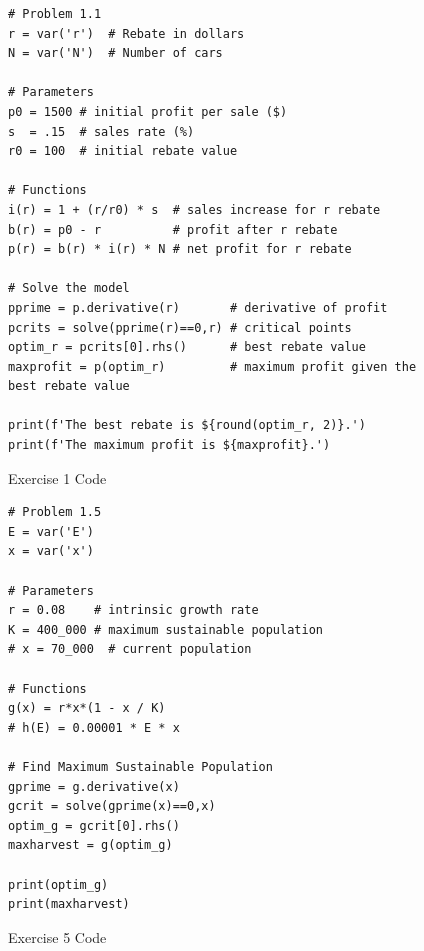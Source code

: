 \documentclass[12pt, oneside]{book}
\begin{document}
\begin{figure}
    \label{ex:1}
    \begin{verbatim}
# Problem 1.1
r = var('r')  # Rebate in dollars
N = var('N')  # Number of cars 

# Parameters
p0 = 1500 # initial profit per sale ($)
s  = .15  # sales rate (%)
r0 = 100  # initial rebate value

# Functions
i(r) = 1 + (r/r0) * s  # sales increase for r rebate
b(r) = p0 - r          # profit after r rebate
p(r) = b(r) * i(r) * N # net profit for r rebate

# Solve the model
pprime = p.derivative(r)       # derivative of profit
pcrits = solve(pprime(r)==0,r) # critical points 
optim_r = pcrits[0].rhs()      # best rebate value
maxprofit = p(optim_r)         # maximum profit given the best rebate value

print(f'The best rebate is ${round(optim_r, 2)}.')
print(f'The maximum profit is ${maxprofit}.')
    \end{verbatim}
    \caption{Exercise 1 Code}
\end{figure}







\begin{figure}
    \label{ex:5}
    \begin{verbatim}
# Problem 1.5
E = var('E')
x = var('x')

# Parameters
r = 0.08    # intrinsic growth rate
K = 400_000 # maximum sustainable population
# x = 70_000  # current population

# Functions
g(x) = r*x*(1 - x / K)
# h(E) = 0.00001 * E * x

# Find Maximum Sustainable Population
gprime = g.derivative(x)
gcrit = solve(gprime(x)==0,x)
optim_g = gcrit[0].rhs()
maxharvest = g(optim_g)

print(optim_g)
print(maxharvest)
    \end{verbatim}
    \caption{Exercise 5 Code}
\end{figure}
\end{document}
